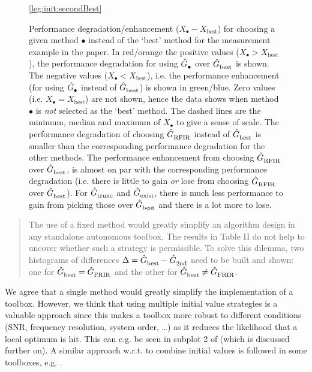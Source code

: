 \begin{figure}
  \centering
  \ref{leg:init:secondBest}
  \setlength{\figurewidth}{0.75\columnwidth}
  \setlength{\figureheight}{0.60\figurewidth}
  
  \caption[Performance degradation/enhancement for selecting the second best model.]{
  Performance degradation/enhancement ($X_{\bullet}-X_{\mathrm{best}}$) for choosing a given method $\bullet$ instead of the `best' method for the measurement example in the paper.
  In red/orange the positive values ($X_{\bullet} > X_{\mathrm{best}}$), the performance degradation for using $\hat{G}_{\mathrm{\bullet}}^{\mathrm{}}$ over $\hat{G}_{\mathrm{best}}^{\mathrm{}}$ is shown.
  The negative values ($X_{\bullet} < X_{\mathrm{best}}$), i.e. the performance enhancement (for using $\hat{G}_{\mathrm{\bullet}}^{\mathrm{}}$ instead of $\hat{G}_{\mathrm{best}}^{\mathrm{}}$) is shown in green/blue.
  Zero values (i.e. $X_{\bullet} = X_{\mathrm{best}}$) are not shown, hence the data shows when method $\bullet$ is \emph{not} selected as the `best' method.
  The dashed lines are the minimum, median and maximum of $X_{\bullet}$ to give a sense of scale.
  The performance degradation of choosing $\hat{G}_{\mathrm{RFIR}}^{\mathrm{}}$ instead of $\hat{G}_{\mathrm{best}}^{\mathrm{}}$ is smaller than the corresponding performance degradation for the other methods.
  The performance enhancement from choosing $\hat{G}_{\mathrm{RFIR}}^{\mathrm{}}$ over $\hat{G}_{\mathrm{best}}^{\mathrm{}}$, is almost on par with the corresponding performance degradation (i.e. there is little to gain \emph{or} lose from choosing $\hat{G}_{\mathrm{RFIR}}^{\mathrm{}}$ over $\hat{G}_{\mathrm{best}}^{\mathrm{}}$).
  For $\hat{G}_{\mathrm{trunc}}^{\mathrm{}}$ and $\hat{G}_{\mathrm{exist}}^{\mathrm{}}$, there is much less performance to gain from picking those over $\hat{G}_{\mathrm{best}}^{\mathrm{}}$ and there is a lot more to lose.
  }
  \label{fig:histogram}
\end{figure}

\begin{quote}

The use of a fixed method would greatly simplify an algorithm design in any standalone autonomous toolbox. The results in Table II do not help to uncover whether such a strategy is permissible. To solve this dilemma, two histograms of differences $\Delta = \hat{G}_{\mathrm{best}}^{\mathrm{}} - \hat{G}_{\mathrm{2nd}}^{\mathrm{}}$ need to be built and shown: one for $\hat{G}_{\mathrm{best}}^{\mathrm{}} = \hat{G}_{\mathrm{FRIR}}^{\mathrm{}}$ and the other for $\hat{G}_{\mathrm{best}}^{\mathrm{}} \neq \hat{G}_{\mathrm{FRIR}}^{\mathrm{}}$.
\end{quote}

We agree that a single method would greatly simplify the implementation of a toolbox.
However, we think that using multiple initial value strategies is a valuable approach since this makes a toolbox more robust to different conditions (SNR, frequency resolution, system order, \ldots) as it reduces the likelihood that a local optimum is hit.
This can e.g. be seen in subplot 2 of  (which is discussed further on).
A similar approach w.r.t. to combine initial values is followed in some toolboxes, e.g. \cite{FDIDENT,TDIDENT}.

